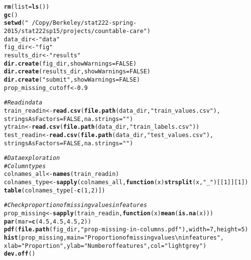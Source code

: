 \documentclass{article}\usepackage[]{graphicx}\usepackage[]{color}
\makeatletter
\newcommand{\hlnum}[1]{\textcolor[rgb]{0.686,0.059,0.569}{#1}}%
\newcommand{\hlstr}[1]{\textcolor[rgb]{0.192,0.494,0.8}{#1}}%
\newcommand{\hlcom}[1]{\textcolor[rgb]{0.678,0.584,0.686}{\textit{#1}}}%
\newcommand{\hlopt}[1]{\textcolor[rgb]{0,0,0}{#1}}%
\newcommand{\hlstd}[1]{\textcolor[rgb]{0.345,0.345,0.345}{#1}}%
\newcommand{\hlkwa}[1]{\textcolor[rgb]{0.161,0.373,0.58}{\textbf{#1}}}%
\newcommand{\hlkwb}[1]{\textcolor[rgb]{0.69,0.353,0.396}{#1}}%
\newcommand{\hlkwc}[1]{\textcolor[rgb]{0.333,0.667,0.333}{#1}}%
\newcommand{\hlkwd}[1]{\textcolor[rgb]{0.737,0.353,0.396}{\textbf{#1}}}%
\newenvironment{kframe}{%
 \def\at@end@of@kframe{}%
 \ifinner\ifhmode%
  \def\at@end@of@kframe{\end{minipage}}%
  \begin{minipage}{\columnwidth}%
 \fi\fi%
 \def\FrameCommand##1{\hskip\@totalleftmargin \hskip-\fboxsep
 \colorbox{shadecolor}{##1}\hskip-\fboxsep
     \hskip-\linewidth \hskip-\@totalleftmargin \hskip\columnwidth}%
 \MakeFramed {\advance\hsize-\width
   \@totalleftmargin\z@ \linewidth\hsize
   \@setminipage}}%
 {\par\unskip\endMakeFramed%
 \at@end@of@kframe}
\newenvironment{knitrout}{}{} %
\makeatother
\begin{document}
\begin{knitrout}
\color{fgcolor}\begin{kframe}
\begin{alltt}
\hlkwd{rm}\hlstd{(}\hlkwc{list} \hlstd{=} \hlkwd{ls}\hlstd{())}
\hlkwd{gc}\hlstd{()}
\hlkwd{setwd}\hlstd{(}\hlstr{"~/Copy/Berkeley/stat222-spring-2015/stat222sp15/projects/countable-care"}\hlstd{)}
\hlstd{data_dir} \hlkwb{<-} \hlstr{"data"}
\hlstd{fig_dir} \hlkwb{<-} \hlstr{"fig"}
\hlstd{results_dir} \hlkwb{<-} \hlstr{"results"}
\hlkwd{dir.create}\hlstd{(fig_dir,} \hlkwc{showWarnings} \hlstd{=} \hlnum{FALSE}\hlstd{)}
\hlkwd{dir.create}\hlstd{(results_dir,} \hlkwc{showWarnings} \hlstd{=} \hlnum{FALSE}\hlstd{)}
\hlkwd{dir.create}\hlstd{(}\hlstr{"submit"}\hlstd{,} \hlkwc{showWarnings} \hlstd{=} \hlnum{FALSE}\hlstd{)}
\hlstd{prop_missing_cutoff} \hlkwb{<-} \hlnum{0.9}

\hlcom{# Read in data}
\hlstd{train_readin} \hlkwb{<-} \hlkwd{read.csv}\hlstd{(}\hlkwd{file.path}\hlstd{(data_dir,} \hlstr{"train_values.csv"}\hlstd{),}
                         \hlkwc{stringsAsFactors} \hlstd{=} \hlnum{FALSE}\hlstd{,} \hlkwc{na.strings} \hlstd{=} \hlstr{""}\hlstd{)}
\hlstd{ytrain} \hlkwb{<-} \hlkwd{read.csv}\hlstd{(}\hlkwd{file.path}\hlstd{(data_dir,} \hlstr{"train_labels.csv"}\hlstd{))}
\hlstd{test_readin} \hlkwb{<-} \hlkwd{read.csv}\hlstd{(}\hlkwd{file.path}\hlstd{(data_dir,} \hlstr{"test_values.csv"}\hlstd{),}
                        \hlkwc{stringsAsFactors} \hlstd{=} \hlnum{FALSE}\hlstd{,} \hlkwc{na.strings} \hlstd{=} \hlstr{""}\hlstd{)}

\hlcom{# Data exploration}
\hlcom{# Column types}
\hlstd{colnames_all} \hlkwb{<-} \hlkwd{names}\hlstd{(train_readin)}
\hlstd{colnames_type} \hlkwb{<-} \hlkwd{sapply}\hlstd{(colnames_all,} \hlkwa{function}\hlstd{(}\hlkwc{x}\hlstd{)} \hlkwd{strsplit}\hlstd{(x,} \hlstr{"_"}\hlstd{)[[}\hlnum{1}\hlstd{]][}\hlnum{1}\hlstd{])}
\hlkwd{table}\hlstd{(colnames_type[}\hlopt{-}\hlkwd{c}\hlstd{(}\hlnum{1}\hlstd{,} \hlnum{2}\hlstd{)])}

\hlcom{# Check proportion of missing values in features}
\hlstd{prop_missing} \hlkwb{<-} \hlkwd{sapply}\hlstd{(train_readin,} \hlkwa{function}\hlstd{(}\hlkwc{x}\hlstd{)} \hlkwd{mean}\hlstd{(}\hlkwd{is.na}\hlstd{(x)))}
\hlkwd{par}\hlstd{(}\hlkwc{mar} \hlstd{=} \hlkwd{c}\hlstd{(}\hlnum{4.5}\hlstd{,} \hlnum{4.5}\hlstd{,} \hlnum{4.5}\hlstd{,} \hlnum{2}\hlstd{))}
\hlkwd{pdf}\hlstd{(}\hlkwd{file.path}\hlstd{(fig_dir,} \hlstr{"prop-missing-in-columns.pdf"}\hlstd{),} \hlkwc{width} \hlstd{=} \hlnum{7}\hlstd{,} \hlkwc{height} \hlstd{=} \hlnum{5}\hlstd{)}
\hlkwd{hist}\hlstd{(prop_missing,} \hlkwc{main} \hlstd{=} \hlstr{"Proportion of missing values\textbackslash{}nin features"}\hlstd{,}
     \hlkwc{xlab} \hlstd{=} \hlstr{"Proportion"}\hlstd{,} \hlkwc{ylab} \hlstd{=} \hlstr{"Number of features"}\hlstd{,} \hlkwc{col} \hlstd{=} \hlstr{"lightgrey"}\hlstd{)}
\hlkwd{dev.off}\hlstd{()}


\end{alltt}
\end{kframe}
\end{knitrout}
\end{document}
